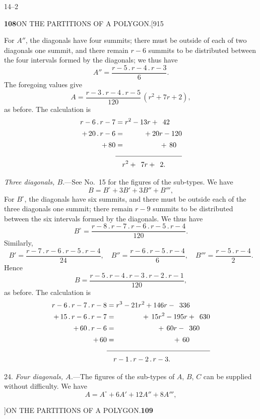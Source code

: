 \documentclass[11pt]{article}
\begin{document}
\hfill 14--2

\newpage
\noindent\textbf{108}\hfill ON THE PARTITIONS OF A POLYGON.\hfill[915

\smallskip
For $A''$, the diagonals have four summits; there must be outside of each of
two diagonals one summit, and there remain $r-6$ summits to be distributed
between the four intervals formed by the diagonals; we thus have
\[
A''=\frac{r-5\,.\,r-4\,.\,r-3}{6}.
\]
The foregoing values give
\[
A=\frac{r-3\,.\,r-4\,.\,r-5}{120}\,(r^{2}+7r+2),
\]
as before. The calculation is
\begin{align*}
r-6\,.\,r-7 &= r^{2}-13r+\phantom{0}42\\
+\,20\,.\,r-6 &= \phantom{r^{2}-1}+20r-120\\
+\,80 &= \phantom{r^{2}-1}\phantom{+20r}+\,80\\[-2pt]
\cline{2-2}
&\phantom{=\,}r^{2}+\phantom{0}7r+\phantom{0}2.
\end{align*}

\hspace{1em} \emph{Three diagonals, $B$.}---See No.~15 for the figures of
the sub-types. We have
\[
B=B^{\circ}+3B'+3B''+B''',
\]
For $B^{\circ}$, the diagonals have six summits, and there must be outside
each of the three diagonals one summit; there remain $r-9$ summits to be
distributed between the six intervals formed by the diagonals. We thus have
\[
B^{\circ}=\frac{r-8\,.\,r-7\,.\,r-6\,.\,r-5\,.\,r-4}{120}.
\]
Similarly,
\[
B'=\frac{r-7\,.\,r-6\,.\,r-5\,.\,r-4}{24},\quad
B''=\frac{r-6\,.\,r-5\,.\,r-4}{6},\quad
B'''=\frac{r-5\,.\,r-4}{2}.
\]
Hence
\[
B=\frac{r-5\,.\,r-4\,.\,r-3\,.\,r-2\,.\,r-1}{120},
\]
as before. The calculation is
\begin{align*}
r-6\,.\,r-7\,.\,r-8 &= r^{3}-21r^{2}+146r-\phantom{0}336\\
+\,15\,.\,r-6\,.\,r-7 &= \phantom{r^{3}-21r}+\,15r^{2}-195r+\phantom{0}630\\
+\,60\,.\,r-6 &= \phantom{r^{3}-21r^{2}+1}+\,60r-\phantom{0}360\\
+\,60 &= \phantom{r^{3}-21r^{2}+146r-}+\,60\\[-2pt]
\cline{2-2}
&\phantom{=\,}r-1\,.\,r-2\,.\,r-3.
\end{align*}

\hspace{1em} 24. \emph{Four diagonals, $A$.}---The figures of the sub-types
of $A$, $B$, $C$ can be supplied without difficulty. We have
\[
A=A^{\circ}+6A'+12A''+8A''',
\]

\newpage
{}]\hfill ON THE PARTITIONS OF A POLYGON.\hfill\textbf{109}
\end{document}
